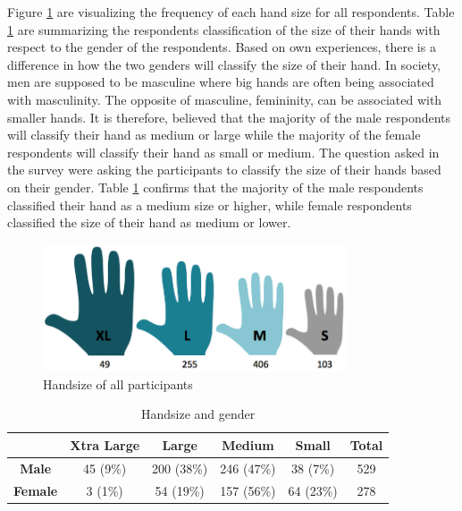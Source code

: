     Figure \ref{fig:handsize} are visualizing the frequency of each hand size for all respondents. Table \ref{tab:HandsizeGender} are summarizing the respondents classification of the size of their hands with respect to the gender of the respondents. Based on own experiences, there is a difference in how the two genders will classify the size of their hand. In society, men are supposed to be masculine where big hands are often being associated with masculinity. The opposite of masculine, femininity, can be associated with smaller hands. It is therefore, believed that the majority of the male respondents will classify their hand as medium or large while the majority of the female respondents will classify their hand as small or medium. The question asked in the survey were asking the participants to classify the size of their hands based on their gender. Table \ref{tab:HandsizeGender} confirms that the majority of the male respondents classified their hand as a medium size or higher, while female respondents classified the size of their hand as medium or lower.

    \begin{figure}[H]
      \centering
      \includegraphics[width=0.8\textwidth]{pics/analysis/handsize.png}
      \caption{Handsize of all participants}
      \label{fig:handsize}
    \end{figure}
    \begin{table}[H]
      \centering
      \begin{tabular}{ c || c | c | c | c || c }
        \hline
        & {\bf Xtra Large} & {\bf Large} & {\bf Medium} & {\bf Small} & {\bf Total}\\ \hline
        {\bf Male} & 45 (9\%) & 200 (38\%) & 246 (47\%) & 38 (7\%) & 529 \\
        {\bf Female} & 3 (1\%) & 54 (19\%) & 157 (56\%) & 64 (23\%) & 278 \\ \hline
      \end{tabular}
      \caption{Handsize and gender}
      \label{tab:HandsizeGender}
    \end{table}


